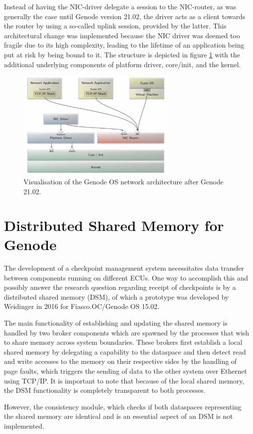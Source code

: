 Instead of having the NIC-driver delegate a session to the NIC-router, as was generally the case until Genode version 21.02, the driver acts as a client towards the router by using a so-called uplink session, provided by the latter. This architectural change was implemented because the NIC driver was deemed too fragile due to its high complexity, leading to the lifetime of an application being put at risk by being bound to it. The structure is depicted in figure \ref{fig:network_architecture} with the additional underlying components of platform driver, core/init, and the kernel. \cite{nic}

\begin{figure}
    \centering
    \includegraphics[width=0.7\textwidth]{Images/network_architecture.png}
    \caption{Visualisation of the Genode OS network architecture after Genode 21.02. \cite{nic}}
    \label{fig:network_architecture}
\end{figure}

\section{Distributed Shared Memory for Genode}\label{section:DSM}
The development of a checkpoint management system necessitates data transfer between components running on different ECUs. One way to accomplish this and possibly answer the research question regarding receipt of checkpoints is by a distributed shared memory (DSM), of which a prototype was developed by Weidinger in 2016 for Fiasco.OC/Genode OS 15.02.

The main functionality of establishing and updating the shared memory is handled by two broker components which are spawned by the processes that wish to share memory across system boundaries. These brokers first establish a local shared memory by delegating a capability to the dataspace and then detect read and write accesses to the memory on their respective sides by the handling of page faults, which triggers the sending of data to the other system over Ethernet using TCP/IP. It is important to note that because of the local shared memory, the DSM functionality is completely transparent to both processes. 

However, the consistency module, which checks if both dataspaces representing the shared memory are identical and is an essential aspect of an DSM is not implemented. \cite{dsm}